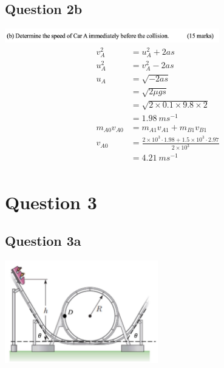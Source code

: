 \documentclass{article}
\begin{document}
\subsection*{Question 2b}
\includegraphics[width=0.7\textwidth]{img/A4Q2b.jpg}
\begin{align*}
    v_A^2        & = u_A^2 + 2as                                                     \\
    u_A^2        & = v_A^2 - 2as                                                     \\
    u_A          & = \sqrt{-2as}                                                     \\
                 & = \sqrt{2\mu gs}                                                  \\
                 & = \sqrt{2\times0.1\times9.8\times2}                               \\
                 & = 1.98\ ms^{-1}                                                   \\
    m_{A0}v_{A0} & = m_{A1}v_{A1} + m_{B1}v_{B1}                                     \\
    v_{A0}       & = \frac{2\times10^3\cdot1.98+1.5\times10^3\cdot2.97}{2\times10^3} \\
                 & = 4.21\ ms^{-1}                                                   \\
\end{align*}

\section*{Question 3}
\subsection*{Question 3a}
\includegraphics[width=0.5\textwidth]{img/A4Fig3.jpg}
\end{document}
